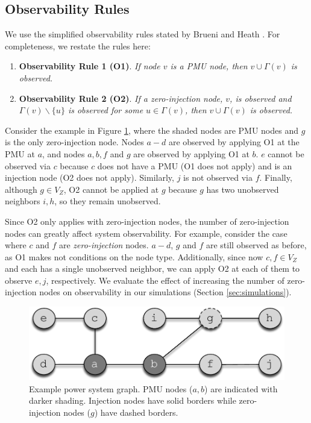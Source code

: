 \subsection{Observability Rules}
\label{subsec:observe}

We use the simplified observability rules stated by Brueni and Heath \cite{Brueni05}. For completeness, we restate the rules here:
\begin{enumerate}
	
	\item {\bf Observability Rule 1 (O1)}.  {\it If node $v$ is a PMU node, then $v \cup \Gamma(v)$ is observed. } %

	\item {\bf Observability Rule 2 (O2)}. {\it If a zero-injection node, $v$, is observed and  $\Gamma(v)\backslash\{u\}$ is observed for some $u\in\Gamma(v)$, then $v \cup \Gamma(v)$ is observed.}

\end{enumerate}

Consider the example in Figure \ref{fig:pmu-example}, where the shaded nodes are PMU nodes and $g$ is the only zero-injection node. 
Nodes $a-d$ are observed by applying O1 at the PMU at $a$, and nodes $a,b,f$ and $g$ are observed by applying O1 at $b$. 
$e$ cannot be observed via $c$ because $c$ does not have a PMU (O1 does not apply) and is an injection node (O2 does not apply). 
Similarly, $j$ is not observed via $f$. Finally, although $g \in V_Z$, O2 cannot be applied at $g$ because $g$ has two unobserved neighbors $i,h$, so they remain unobserved.

Since O2 only applies with zero-injection nodes, the number of zero-injection nodes can greatly affect system observability. 
For example, consider the case where $c$ and $f$ are {\em zero-injection} nodes. $a-d$, $g$ and $f$ are still observed as before, as O1 makes not conditions on the node type. Additionally, 
since now $c,f \in V_Z$ and each has a single unobserved neighbor,  we can apply O2 at each of them to observe $e,j$, respectively. %
We evaluate the effect of increasing the number of zero-injection nodes on observability in our simulations (Section \ref{sec:simulations}).


\begin{figure}[t]
\centering
\includegraphics[scale=.6]{figs/pmu-example.pdf}
\caption{Example power system graph. PMU nodes ($a,b$) are indicated with darker shading. Injection nodes have solid borders while zero-injection nodes  ($g$) have dashed borders.}
\label{fig:pmu-example}
\end{figure}


